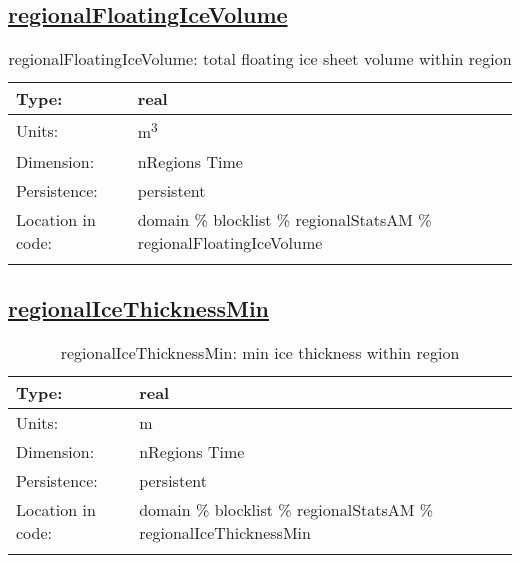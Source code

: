 \subsection[regionalFloatingIceVolume]{\hyperref[sec:var_tab_regionalStatsAM]{regionalFloatingIceVolume}}
\label{subsec:var_sec_regionalStatsAM_regionalFloatingIceVolume}
\begin{center}
\begin{longtable}{| p{2.0in} | p{4.0in} |}
        \hline 
        Type: & real \\
        \hline 
        Units: & \si{m^3} \\
        \hline 
        Dimension: & nRegions Time \\
        \hline 
        Persistence: & persistent \\
        \hline 
         Location in code: & domain \% blocklist \% regionalStatsAM \% regionalFloatingIceVolume \\
         \hline 
    \caption{regionalFloatingIceVolume: total floating ice sheet volume within region}
\end{longtable}
\end{center}
\subsection[regionalIceThicknessMin]{\hyperref[sec:var_tab_regionalStatsAM]{regionalIceThicknessMin}}
\label{subsec:var_sec_regionalStatsAM_regionalIceThicknessMin}
\begin{center}
\begin{longtable}{| p{2.0in} | p{4.0in} |}
        \hline 
        Type: & real \\
        \hline 
        Units: & \si{m} \\
        \hline 
        Dimension: & nRegions Time \\
        \hline 
        Persistence: & persistent \\
        \hline 
         Location in code: & domain \% blocklist \% regionalStatsAM \% regionalIceThicknessMin \\
         \hline 
    \caption{regionalIceThicknessMin: min ice thickness within region}
\end{longtable}
\end{center}
